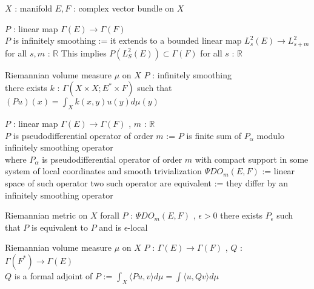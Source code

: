 \begin{When}
\itemwhen \(X\) : manifold
\itemwhen \(E , F\) : complex vector bundle on \(X\)
\end{When}

\begin{Definition}
\itemdefi
  \For \(P\) : linear map \(\Gamma(E) \to \Gamma(F)\) \\
  \Define \(P\) is infinitely smoothing := it extends to a bounded linear map \(L^2_s(E) \to L^2_{s+m}\) for all \(s,m\) : \(\mathbb{R}\)
\itemprop
  \Then This implies \(P(L^2_S(E)) \subset \Gamma(F)\) for all \(s\) : \(\mathbb{R}\)
\end{Definition}

\begin{Theorem}
\itemwhen
  \Fix Riemannian volume measure \(\mu\) on \(X\)
\itemprop
  \For \(P\) : infinitely smoothing \\
  \Then there exists \(k\) : \(\Gamma(X \times X ; E^* \times F)\) such that \((P u)(x) = \int_X k(x,y) u(y) d\mu (y)\)
\end{Theorem}

\begin{Definition}
\itemdefi
  \For \(P\) : linear map \(\Gamma(E) \to \Gamma(F)\) , \(m\) : \(\mathbb{R}\) \\
  \Define \(P\) is pseudodifferential operator of order \(m\) := \(P\) is finite sum of \(P_\alpha\) modulo infinitely smoothing operator \\
  where \(P_\alpha\) is pseudodifferential operator of order \(m\) with compact support in some system of local coordinates and smooth trivialization 
\itemdefi
  \Define \(\Psi DO_m(E,F)\) := linear space of such operator
\itemdefi
  \Define two such operator are equivalent := they differ by an infinitely smoothing operator
\end{Definition}

\begin{Theorem}
\itemwhen
  \Fix Riemannian metric on \(X\)
\itemprop
  \Then forall \(P\) : \(\Psi DO_m(E,F)\) , \(\epsilon > 0\) there exists \(P_{\epsilon}\) such that \(P\) is equivalent to \(P\) and is \(\epsilon\)-local  \\
\end{Theorem}

\begin{Definition}
\itemwhen
  \Fix Riemannian volume measure \(\mu\) on \(X\)
\itemdefi
  \For \(P\) : \(\Gamma(E) \to \Gamma(F)\) , \(Q\) : \(\Gamma(F^*) \to \Gamma(E)\) \\
  \Define \(Q\) is a formal adjoint of \(P\) := \(\int_X \langle P u , v \rangle d \mu = \int \langle u , Q v \rangle d\mu\)
\end{Definition}

